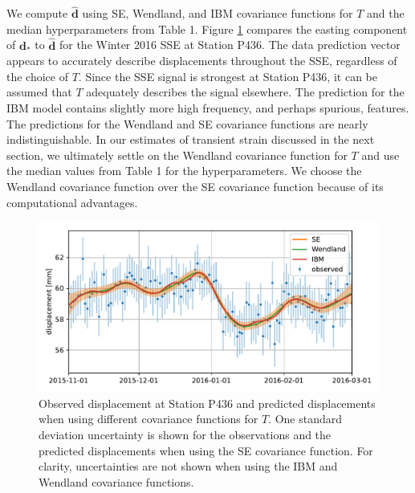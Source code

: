 \documentclass[10pt,letter]{article}
\begin{document}
We compute $\hat{\bm{d}}$ using SE, Wendland, and IBM covariance functions for $T$ and the median hyperparameters from Table 1. Figure \ref{fig:Fit} compares the easting component of $\bm{d}_*$ to $\hat{\bm{d}}$ for the Winter 2016 SSE at Station P436. The data prediction vector appears to accurately describe displacements throughout the SSE, regardless of the choice of $T$. Since the SSE signal is strongest at Station P436, it can be assumed that $T$ adequately describes the signal elsewhere. The prediction for the IBM model contains slightly more high frequency, and perhaps spurious, features. The predictions for the Wendland and SE covariance functions are nearly indistinguishable. In our estimates of transient strain discussed in the next section, we ultimately settle on the Wendland covariance function for $T$ and use the median values from Table 1 for the hyperparameters. We choose the Wendland covariance function over the SE covariance function because of its computational advantages.     

\begin{figure}
\includegraphics{figures/signal_fit/signal-fit.pdf}
\caption{Observed displacement at Station P436 and predicted displacements when using different covariance functions for $T$. One standard deviation uncertainty is shown for the observations and the predicted displacements when using the SE covariance function. For clarity, uncertainties are not shown when using the IBM and Wendland covariance functions.}   
\label{fig:Fit}
\end{figure}
\end{document}
